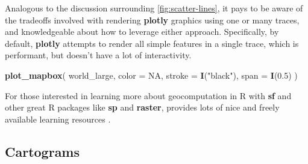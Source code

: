 \documentclass[
  12pt,
]{krantz}
\newenvironment{Shaded}{\begin{snugshade}}{\end{snugshade}}
\newcommand{\CommentTok}[1]{\textcolor[rgb]{0.56,0.35,0.01}{\textit{#1}}}
\newcommand{\DataTypeTok}[1]{\textcolor[rgb]{0.13,0.29,0.53}{#1}}
\newcommand{\FloatTok}[1]{\textcolor[rgb]{0.00,0.00,0.81}{#1}}
\newcommand{\KeywordTok}[1]{\textcolor[rgb]{0.13,0.29,0.53}{\textbf{#1}}}
\newcommand{\NormalTok}[1]{#1}
\newcommand{\OperatorTok}[1]{\textcolor[rgb]{0.81,0.36,0.00}{\textbf{#1}}}
\newcommand{\OtherTok}[1]{\textcolor[rgb]{0.56,0.35,0.01}{#1}}
\newcommand{\StringTok}[1]{\textcolor[rgb]{0.31,0.60,0.02}{#1}}
\begin{document}
\begin{Shaded}
\end{Shaded}

Analogous to the discussion surrounding \ref{fig:scatter-lines}, it pays to be aware of the tradeoffs involved with rendering \textbf{plotly} graphics using one or many traces, and knowledgeable about how to leverage either approach. Specifically, by default, \textbf{plotly} attempts to render all simple features in a single trace, which is performant, but doesn't have a lot of interactivity.

\begin{Shaded}
\begin{Highlighting}[]
\KeywordTok{plot_mapbox}\NormalTok{(}
\NormalTok{  world_large, }
  \DataTypeTok{color =} \OtherTok{NA}\NormalTok{, }
  \DataTypeTok{stroke =} \KeywordTok{I}\NormalTok{(}\StringTok{"black"}\NormalTok{), }
  \DataTypeTok{span =} \KeywordTok{I}\NormalTok{(}\FloatTok{0.5}\NormalTok{)}
\NormalTok{)}
\end{Highlighting}
\end{Shaded}

For those interested in learning more about geocomputation in R with \textbf{sf} and other great R packages like \textbf{sp} and \textbf{raster}, \citet{geocomputation} provides lots of nice and freely available learning resources \citep{sp, raster}.

\hypertarget{cartograms}{%
\subsection{Cartograms}\label{cartograms}}
\end{document}
